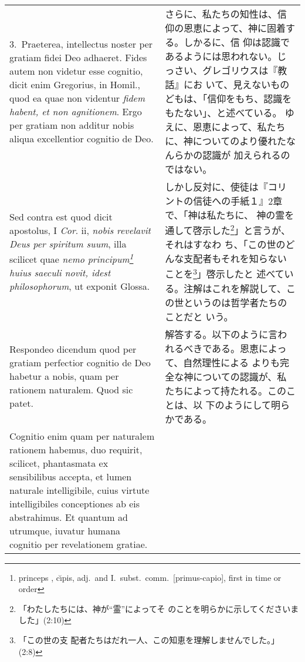 \documentclass[10pt]{jsarticle} %
\begin{document}
\begin{longtable}{p{21em}p{21em}}
\\

3.~{\sc Praeterea}, intellectus noster per gratiam fidei Deo
adhaeret. Fides autem non videtur esse cognitio, dicit enim Gregorius,
in Homil., quod ea quae non videntur {\it fidem habent, et non
agnitionem}. Ergo per gratiam non additur nobis aliqua excellentior
cognitio de Deo.

&

さらに、私たちの知性は、信仰の恩恵によって、神に固着する。しかるに、信
仰は認識であるようには思われない。じっさい、グレゴリウスは『教話』にお
いて、見えないものどもは、「信仰をもち、認識をもたない」、と述べている。
ゆえに、恩恵によって、私たちに、神についてのより優れたなんらかの認識が
加えられるのではない。

\\

{\sc Sed contra est} quod dicit apostolus, I {\it Cor}. {\sc ii}, {\it
nobis revelavit Deus per spiritum suum}, illa scilicet quae {\it nemo
principum\footnote{princeps , c\u{\i}pis, adj.\ and I.~subst.\ comm.\
[primus-capio], first in time or order} huius saeculi novit, idest
philosophorum}, ut exponit Glossa.

&

しかし反対に、使徒は『コリントの信徒への手紙１』2章で、「神は私たちに、
神の霊を通して啓示した\footnote{「わたしたちには、神が``霊''によってそ
のことを明らかに示してくださいました」(2:10)}」と言うが、それはすなわ
ち、「この世のどんな支配者もそれを知らないことを\footnote{「この世の支
配者たちはだれ一人、この知恵を理解しませんでした。」(2:8)}」啓示したと
述べている。注解はこれを解説して、この世というのは哲学者たちのことだと
いう。

\\

{\sc Respondeo dicendum} quod per gratiam perfectior cognitio de Deo
habetur a nobis, quam per rationem naturalem. Quod sic patet. 

&

解答する。以下のように言われるべきである。恩恵によって、自然理性による
よりも完全な神についての認識が、私たちによって持たれる。このことは、以
下のようにして明らかである。

\\

Cognitio enim quam per naturalem rationem habemus, duo requirit,
scilicet, phantasmata ex sensibilibus accepta, et lumen naturale
intelligibile, cuius virtute intelligibiles conceptiones ab eis
abstrahimus. Et quantum ad utrumque, iuvatur humana cognitio per
revelationem gratiae.


\end{longtable}
\end{document}

